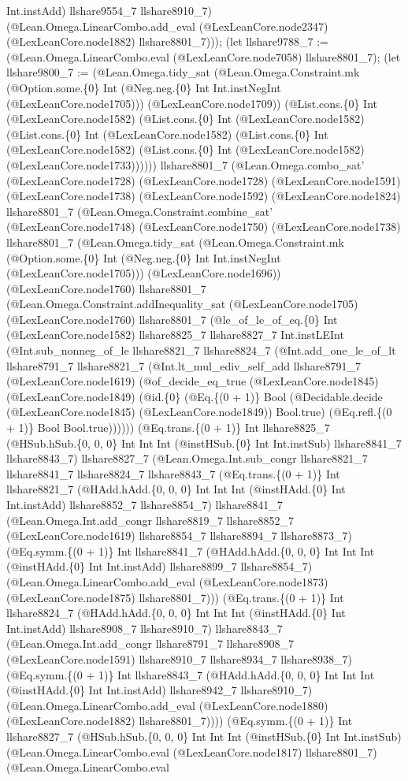 \documentclass[11pt]{article}
\begin{document}
Int.instAdd) llshare9554\_7 llshare8910\_7) (@Lean.Omega.LinearCombo.add\_eval (@LexLeanCore.node2347) (@LexLeanCore.node1882) llshare8801\_7))); (let llshare9788\_7 := (@Lean.Omega.LinearCombo.eval (@LexLeanCore.node7058) llshare8801\_7); (let llshare9800\_7 := (@Lean.Omega.tidy\_sat (@Lean.Omega.Constraint.mk (@Option.some.\{0\} Int (@Neg.neg.\{0\} Int Int.instNegInt (@LexLeanCore.node1705))) (@LexLeanCore.node1709)) (@List.cons.\{0\} Int (@LexLeanCore.node1582) (@List.cons.\{0\} Int (@LexLeanCore.node1582) (@List.cons.\{0\} Int (@LexLeanCore.node1582) (@List.cons.\{0\} Int (@LexLeanCore.node1582) (@List.cons.\{0\} Int (@LexLeanCore.node1582) (@LexLeanCore.node1733)))))) llshare8801\_7 (@Lean.Omega.combo\_sat' (@LexLeanCore.node1728) (@LexLeanCore.node1728) (@LexLeanCore.node1591) (@LexLeanCore.node1738) (@LexLeanCore.node1592) (@LexLeanCore.node1824) llshare8801\_7 (@Lean.Omega.Constraint.combine\_sat' (@LexLeanCore.node1748) (@LexLeanCore.node1750) (@LexLeanCore.node1738) llshare8801\_7 (@Lean.Omega.tidy\_sat (@Lean.Omega.Constraint.mk (@Option.some.\{0\} Int (@Neg.neg.\{0\} Int Int.instNegInt (@LexLeanCore.node1705))) (@LexLeanCore.node1696)) (@LexLeanCore.node1760) llshare8801\_7 (@Lean.Omega.Constraint.addInequality\_sat (@LexLeanCore.node1705) (@LexLeanCore.node1760) llshare8801\_7 (@le\_of\_le\_of\_eq.\{0\} Int (@LexLeanCore.node1582) llshare8825\_7 llshare8827\_7 Int.instLEInt (@Int.sub\_nonneg\_of\_le llshare8821\_7 llshare8824\_7 (@Int.add\_one\_le\_of\_lt llshare8791\_7 llshare8821\_7 (@Int.lt\_mul\_ediv\_self\_add llshare8791\_7 (@LexLeanCore.node1619) (@of\_decide\_eq\_true (@LexLeanCore.node1845) (@LexLeanCore.node1849) (@id.\{0\} (@Eq.\{(0 + 1)\} Bool (@Decidable.decide (@LexLeanCore.node1845) (@LexLeanCore.node1849)) Bool.true) (@Eq.refl.\{(0 + 1)\} Bool Bool.true)))))) (@Eq.trans.\{(0 + 1)\} Int llshare8825\_7 (@HSub.hSub.\{0, 0, 0\} Int Int Int (@instHSub.\{0\} Int Int.instSub) llshare8841\_7 llshare8843\_7) llshare8827\_7 (@Lean.Omega.Int.sub\_congr llshare8821\_7 llshare8841\_7 llshare8824\_7 llshare8843\_7 (@Eq.trans.\{(0 + 1)\} Int llshare8821\_7 (@HAdd.hAdd.\{0, 0, 0\} Int Int Int (@instHAdd.\{0\} Int Int.instAdd) llshare8852\_7 llshare8854\_7) llshare8841\_7 (@Lean.Omega.Int.add\_congr llshare8819\_7 llshare8852\_7 (@LexLeanCore.node1619) llshare8854\_7 llshare8894\_7 llshare8873\_7) (@Eq.symm.\{(0 + 1)\} Int llshare8841\_7 (@HAdd.hAdd.\{0, 0, 0\} Int Int Int (@instHAdd.\{0\} Int Int.instAdd) llshare8899\_7 llshare8854\_7) (@Lean.Omega.LinearCombo.add\_eval (@LexLeanCore.node1873) (@LexLeanCore.node1875) llshare8801\_7))) (@Eq.trans.\{(0 + 1)\} Int llshare8824\_7 (@HAdd.hAdd.\{0, 0, 0\} Int Int Int (@instHAdd.\{0\} Int Int.instAdd) llshare8908\_7 llshare8910\_7) llshare8843\_7 (@Lean.Omega.Int.add\_congr llshare8791\_7 llshare8908\_7 (@LexLeanCore.node1591) llshare8910\_7 llshare8934\_7 llshare8938\_7) (@Eq.symm.\{(0 + 1)\} Int llshare8843\_7 (@HAdd.hAdd.\{0, 0, 0\} Int Int Int (@instHAdd.\{0\} Int Int.instAdd) llshare8942\_7 llshare8910\_7) (@Lean.Omega.LinearCombo.add\_eval (@LexLeanCore.node1880) (@LexLeanCore.node1882) llshare8801\_7)))) (@Eq.symm.\{(0 + 1)\} Int llshare8827\_7 (@HSub.hSub.\{0, 0, 0\} Int Int Int (@instHSub.\{0\} Int Int.instSub) (@Lean.Omega.LinearCombo.eval (@LexLeanCore.node1817) llshare8801\_7) (@Lean.Omega.LinearCombo.eval 
\end{document}
